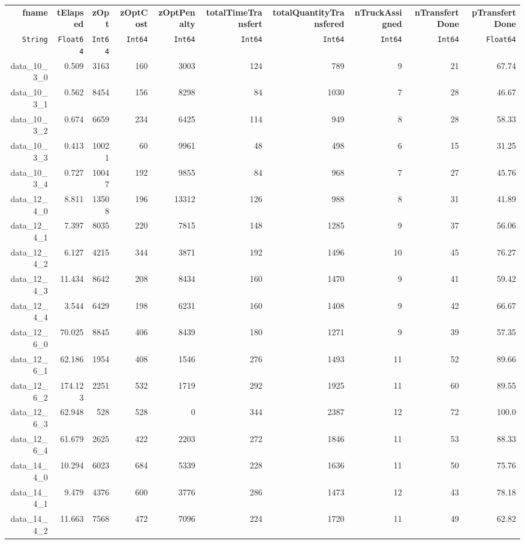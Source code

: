 \begin{tabular}{rrrrrrrrrr}
  \hline
  \textbf{fname} & \textbf{tElapsed} & \textbf{zOpt} & \textbf{zOptCost} & \textbf{zOptPenalty} & \textbf{totalTimeTransfert} & \textbf{totalQuantityTransfered} & \textbf{nTruckAssigned} & \textbf{nTransfertDone} & \textbf{pTransfertDone} \\
  \texttt{String} & \texttt{Float64} & \texttt{Int64} & \texttt{Int64} & \texttt{Int64} & \texttt{Int64} & \texttt{Int64} & \texttt{Int64} & \texttt{Int64} & \texttt{Float64} \\\hline
  data\_10\_3\_0 & 0.509 & 3163 & 160 & 3003 & 124 & 789 & 9 & 21 & 67.74 \\
  data\_10\_3\_1 & 0.562 & 8454 & 156 & 8298 & 84 & 1030 & 7 & 28 & 46.67 \\
  data\_10\_3\_2 & 0.674 & 6659 & 234 & 6425 & 114 & 949 & 8 & 28 & 58.33 \\
  data\_10\_3\_3 & 0.413 & 10021 & 60 & 9961 & 48 & 498 & 6 & 15 & 31.25 \\
  data\_10\_3\_4 & 0.727 & 10047 & 192 & 9855 & 84 & 968 & 7 & 27 & 45.76 \\
  data\_12\_4\_0 & 8.811 & 13508 & 196 & 13312 & 126 & 988 & 8 & 31 & 41.89 \\
  data\_12\_4\_1 & 7.397 & 8035 & 220 & 7815 & 148 & 1285 & 9 & 37 & 56.06 \\
  data\_12\_4\_2 & 6.127 & 4215 & 344 & 3871 & 192 & 1496 & 10 & 45 & 76.27 \\
  data\_12\_4\_3 & 11.434 & 8642 & 208 & 8434 & 160 & 1470 & 9 & 41 & 59.42 \\
  data\_12\_4\_4 & 3.544 & 6429 & 198 & 6231 & 160 & 1408 & 9 & 42 & 66.67 \\
  data\_12\_6\_0 & 70.025 & 8845 & 406 & 8439 & 180 & 1271 & 9 & 39 & 57.35 \\
  data\_12\_6\_1 & 62.186 & 1954 & 408 & 1546 & 276 & 1493 & 11 & 52 & 89.66 \\
  data\_12\_6\_2 & 174.123 & 2251 & 532 & 1719 & 292 & 1925 & 11 & 60 & 89.55 \\
  data\_12\_6\_3 & 62.948 & 528 & 528 & 0 & 344 & 2387 & 12 & 72 & 100.0 \\
  data\_12\_6\_4 & 61.679 & 2625 & 422 & 2203 & 272 & 1846 & 11 & 53 & 88.33 \\
  data\_14\_4\_0 & 10.294 & 6023 & 684 & 5339 & 228 & 1636 & 11 & 50 & 75.76 \\
  data\_14\_4\_1 & 9.479 & 4376 & 600 & 3776 & 286 & 1473 & 12 & 43 & 78.18 \\
  data\_14\_4\_2 & 11.663 & 7568 & 472 & 7096 & 224 & 1720 & 11 & 49 & 62.82 \\

\end{tabular}
